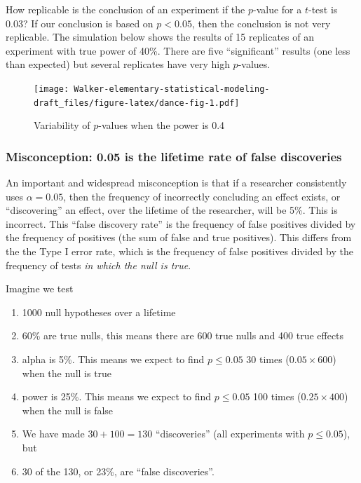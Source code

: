 \documentclass[]{book}
\providecommand{\tightlist}{%
  \setlength{\itemsep}{0pt}\setlength{\parskip}{0pt}}
\theoremstyle{definition}
\theoremstyle{definition}
\theoremstyle{definition}
\theoremstyle{remark}
\begin{document}
How replicable is the conclusion of an experiment if the \(p\)-value for
a \(t\)-test is 0.03? If our conclusion is based on \(p < 0.05\), then
the conclusion is not very replicable. The simulation below shows the
results of 15 replicates of an experiment with true power of 40\%. There
are five ``significant'' results (one less than expected) but several
replicates have very high \(p\)-values.

\begin{figure}
\centering
\texttt{[image: Walker-elementary-statistical-modeling-draft\_files/figure-latex/dance-fig-1.pdf]}
\caption{\label{fig:dance-fig}Variability of \(p\)-values when the power is
0.4}
\end{figure}

\subsubsection{Misconception: 0.05 is the lifetime rate of false
discoveries}\label{misconception-0.05-is-the-lifetime-rate-of-false-discoveries}

An important and widespread misconception is that if a researcher
consistently uses \(\alpha=0.05\), then the frequency of incorrectly
concluding an effect exists, or ``discovering'' an effect, over the
lifetime of the researcher, will be 5\%. This is incorrect. This ``false
discovery rate'' is the frequency of false positives divided by the
frequency of positives (the sum of false and true positives). This
differs from the the Type I error rate, which is the frequency of false
positives divided by the frequency of tests \emph{in which the null is
true}.

Imagine we test

\begin{enumerate}
\def\labelenumi{\arabic{enumi}.}
\tightlist
\item
  1000 null hypotheses over a lifetime
\item
  60\% are true nulls, this means there are 600 true nulls and 400 true
  effects
\item
  alpha is 5\%. This means we expect to find \(p \le 0.05\) 30 times
  (\(0.05 \times 600\)) when the null is true
\item
  power is 25\%. This means we expect to find \(p \le 0.05\) 100 times
  (\(0.25 \times 400\)) when the null is false
\item
  We have made \(30 + 100=130\) ``discoveries'' (all experiments with
  \(p \le 0.05\)), but
\item
  30 of the 130, or 23\%, are ``false discoveries''.
\end{enumerate}
\end{document}
